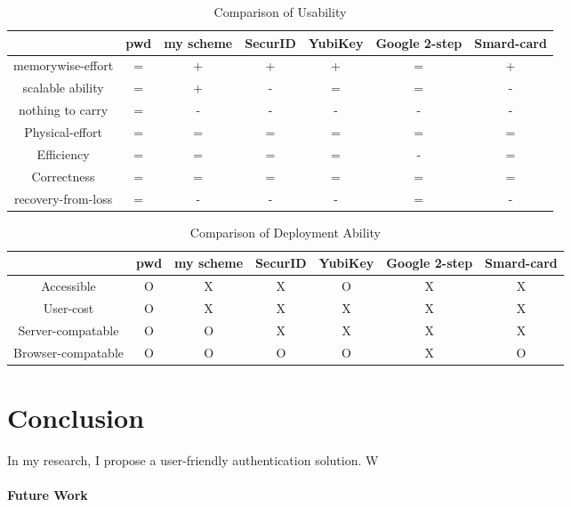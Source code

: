 \begin{CJK}{Bg5}{bsmi}
\begin{table}[h]
\begin{tabular}{|c|c|c|c|c|c|c|}
\hline
                   & pwd & my scheme & SecurID & YubiKey & Google 2-step & Smard-card \\ \hline
memorywise-effort  & =   & +         & +       & +       & =             & +          \\ \hline
scalable ability   & =   & +         & -       & =       & =             & -          \\ \hline
nothing to carry   & =   & -         & -       & -       & -             & -          \\ \hline
Physical-effort    & =   & =         & =       & =       & =             & =          \\ \hline
Efficiency         & =   & =         & =       & =       & -             & =          \\ \hline
Correctness        & =   & =         & =       & =       & =             & =          \\ \hline
recovery-from-loss & =   & -         & -       & -       & =             & -          \\ \hline
\end{tabular}
\caption{Comparison of Usability}
\end{table}

\begin{table}[h]
\begin{tabular}{|c|c|c|c|c|c|c|}
\hline
                   & pwd & my scheme & SecurID & YubiKey & Google 2-step & Smard-card \\ \hline
Accessible         & O   & X         & X       & O       & X             & X          \\ \hline
User-cost          & O   & X         & X       & X       & X             & X          \\ \hline
Server-compatable  & O   & O         & X       & X       & X             & X          \\ \hline
Browser-compatable & O   & O         & O       & O       & X             & O          \\ \hline
\end{tabular}
\caption{Comparison of Deployment Ability}
\end{table}

\chapter{Conclusion}

In my research, I propose a user-friendly authentication solution. W

\subsubsection{Future Work}

\end{CJK}